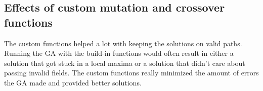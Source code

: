 \documentclass{article}
\begin{document}
\begin{description}
\begin{description}
    \subsection{Effects of custom mutation and crossover functions}
        The custom functions helped a lot with keeping the solutions on valid paths. Running the GA with the build-in functions would often result in either a solution that got stuck in a local maxima or a solution that didn't care about passing invalid fields. The custom functions really minimized the amount of errors the GA made and provided better solutions.


	\begin{figure}[H]
		\begin{minipage}{.5\linewidth}
			\centering
		 \end{minipage}%
		\begin{minipage}{.5\linewidth}
			\centering
		 \end{minipage}\par\medskip%
		\begin{minipage}{.5\linewidth}
			\centering
			\subfloat[]{
				\label{fig:default_mutation}
}
\end{minipage}
\end{figure}
\end{description}
\end{description}
\end{document}
